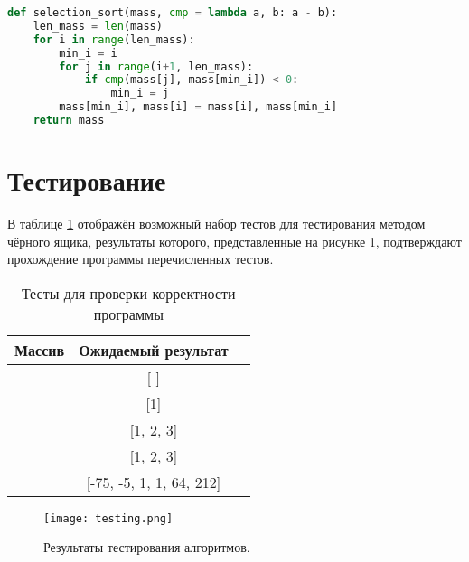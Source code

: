         \begin{lstlisting}[language=python, label=lst:selection, caption=Реализация алгоритма сортировки выбором]
def selection_sort(mass, cmp = lambda a, b: a - b):
    len_mass = len(mass)
    for i in range(len_mass):
        min_i = i
        for j in range(i+1, len_mass):
            if cmp(mass[j], mass[min_i]) < 0:
                min_i = j
        mass[min_i], mass[i] = mass[i], mass[min_i]
    return mass
        \end{lstlisting}
    
        
    \section{Тестирование}
        В таблице \ref{table:testing} отображён возможный набор тестов
        для тестирования методом чёрного ящика, результаты которого, 
        представленные на рисунке \ref{png:testing:result}, подтверждают
        прохождение программы перечисленных тестов.

        \begin{table}[]
            \caption{Тесты для проверки корректности программы}

            \centering
            \begin{tabular}{|c|c|c|}
                \hline
                Массив                      & Ожидаемый результат           \\ \hline
                  [ ]                       &        [ ]                    \\ \hline
                  [1]                       &        [1]                    \\ \hline
                [1, 2, 3]                   &     [1, 2, 3]                 \\ \hline
                [3, 2, 1]                   &     [1, 2, 3]                 \\ \hline
                [1, 212, -5, 1, 64, -75]    &     [-75, -5, 1, 1, 64, 212]  \\ \hline
                \end{tabular}
            \label{table:testing}
        \end{table}
        
        \begin{figure}[h!]
            \centering
            \texttt{[image: testing.png]}
            \caption{Результаты тестирования алгоритмов.}
            \label{png:testing:result}
        \end{figure}
\newpage